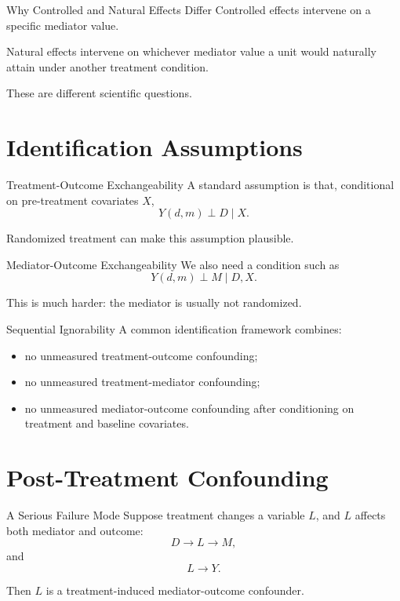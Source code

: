 \documentclass[aspectratio=169,11pt]{beamer}
\begin{document}
\begin{frame}{Why Controlled and Natural Effects Differ}
Controlled effects intervene on a specific mediator value.

Natural effects intervene on whichever mediator value a unit would naturally attain under another treatment condition.

These are different scientific questions.
\end{frame}

\section{Identification Assumptions}

\begin{frame}{Treatment-Outcome Exchangeability}
A standard assumption is that, conditional on pre-treatment covariates \(X\),
\[
Y(d,m) \perp D \mid X.
\]

Randomized treatment can make this assumption plausible.
\end{frame}

\begin{frame}{Mediator-Outcome Exchangeability}
We also need a condition such as
\[
Y(d,m) \perp M \mid D,X.
\]

This is much harder: the mediator is usually not randomized.
\end{frame}

\begin{frame}{Sequential Ignorability}
A common identification framework combines:
\begin{itemize}
\item no unmeasured treatment-outcome confounding;
\item no unmeasured treatment-mediator confounding;
\item no unmeasured mediator-outcome confounding after conditioning on treatment and baseline covariates.
\end{itemize}
\end{frame}

\section{Post-Treatment Confounding}

\begin{frame}{A Serious Failure Mode}
Suppose treatment changes a variable \(L\), and \(L\) affects both mediator and outcome:
\[
D \rightarrow L \rightarrow M,
\]
and
\[
L \rightarrow Y.
\]

Then \(L\) is a treatment-induced mediator-outcome confounder.
\end{frame}
\end{document}
